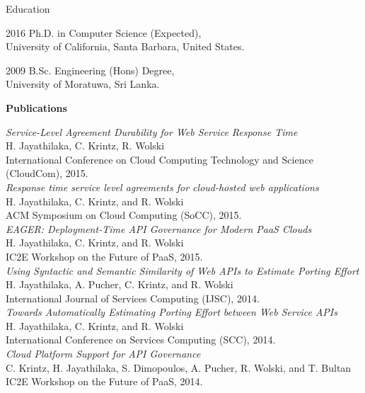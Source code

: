 \begin{vitae}

\begin{vitaesection}{Education}
\vspace{-0.1cm}
\item [2016]	Ph.D. in Computer Science (Expected), \\ University of California, Santa Barbara, United States.
\item [2009]	B.Sc. Engineering (Hons) Degree, \\ University of Moratuwa, Sri Lanka.
\end{vitaesection}

\textbf{Publications}

\textit{Service-Level Agreement Durability for Web Service Response Time} \\
H. Jayathilaka, C. Krintz, R. Wolski \\
International Conference on Cloud Computing Technology and Science (CloudCom), 2015. \\

\textit{Response time service level agreements for cloud-hosted web applications} \\
H. Jayathilaka, C. Krintz, and R. Wolski \\
ACM Symposium on Cloud Computing (SoCC), 2015. \\

\textit{EAGER: Deployment-Time API Governance for Modern PaaS Clouds} \\
H. Jayathilaka, C. Krintz, and R. Wolski \\
IC2E Workshop on the Future of PaaS, 2015. \\

\textit{Using Syntactic and Semantic Similarity of Web APIs to Estimate Porting Effort} \\
H. Jayathilaka, A. Pucher, C. Krintz, and R. Wolski \\
International Journal of Services Computing (IJSC), 2014. \\

\textit{Towards Automatically Estimating Porting Effort between Web Service APIs} \\
H. Jayathilaka, C. Krintz, and R. Wolski \\
International Conference on Services Computing (SCC), 2014. \\

\textit{Cloud Platform Support for API Governance} \\
C. Krintz, H. Jayathilaka, S. Dimopoulos, A. Pucher, R. Wolski, and T. Bultan \\
IC2E Workshop on the Future of PaaS, 2014. \\


\end{vitae}
